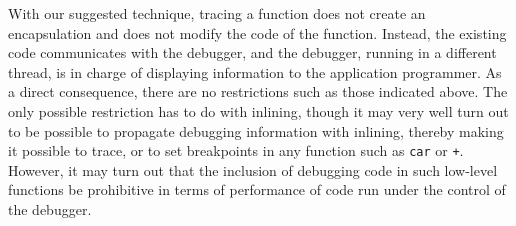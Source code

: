 With our suggested technique, tracing a function does not create an
encapsulation and does not modify the code of the function.  Instead,
the existing code communicates with the debugger, and the debugger,
running in a different thread, is in charge of displaying information
to the application programmer.  As a direct consequence, there are no
restrictions such as those indicated above.  The only possible
restriction has to do with inlining, though it may very well turn out
to be possible to propagate debugging information with inlining,
thereby making it possible to trace, or to set breakpoints in any
function such as \texttt{car} or \texttt{+}.  However, it may turn out
that the inclusion of debugging code in such low-level functions be
prohibitive in terms of performance of code run under the control of
the debugger.
